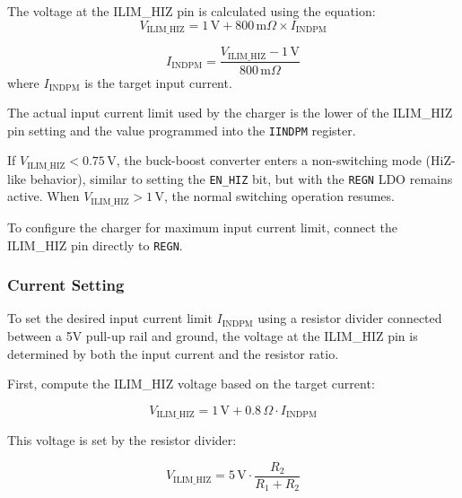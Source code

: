 \documentclass[12pt]{article}
\begin{document}
The voltage at the ILIM\_HIZ pin is calculated using the equation:
\begin{equation}
V_{\text{ILIM\_HIZ}} = 1\,\text{V} + 800\,\text{m}\Omega \times I_{\text{INDPM}}
\label{equ:ILIM_HIZ_voltage}
\end{equation}

\begin{equation}
I_{\text{INDPM}} = \frac{V_{\text{ILIM\_HIZ}} - 1\,\text{V}}{800\,\text{m}\Omega}
\label{equ:INDPM_current}
\end{equation}
where \( I_{\text{INDPM}} \) is the target input current.

The actual input current limit used by the charger is the lower of the ILIM\_HIZ pin setting and the value programmed into the \texttt{IINDPM} register.

If \( V_{\text{ILIM\_HIZ}} < 0.75\,\text{V} \), the buck-boost converter enters a non-switching mode (HiZ-like behavior), similar to setting the \texttt{EN\_HIZ} bit, but with the \texttt{REGN} LDO remains active. When \( V_{\text{ILIM\_HIZ}} > 1\,\text{V} \), the normal switching operation resumes.

To configure the charger for maximum input current limit, connect the ILIM\_HIZ pin directly to \texttt{REGN}.

\subsubsection{Current Setting}
To set the desired input current limit \( I_{\text{INDPM}} \) using a resistor divider connected between a 5V pull-up rail and ground, the voltage at the ILIM\_HIZ pin is determined by both the input current and the resistor ratio.

First, compute the ILIM\_HIZ voltage based on the target current:

\begin{equation}
V_{\text{ILIM\_HIZ}} = 1\,\text{V} + 0.8\,\Omega \cdot I_{\text{INDPM}}
\label{equ:ILIM_HIZ_voltage_2}
\end{equation}

This voltage is set by the resistor divider:

\begin{equation}
V_{\text{ILIM\_HIZ}} = 5\,\text{V} \cdot \frac{R_2}{R_1 + R_2}
\label{equ:divider_voltage}
\end{equation}
\end{document}
